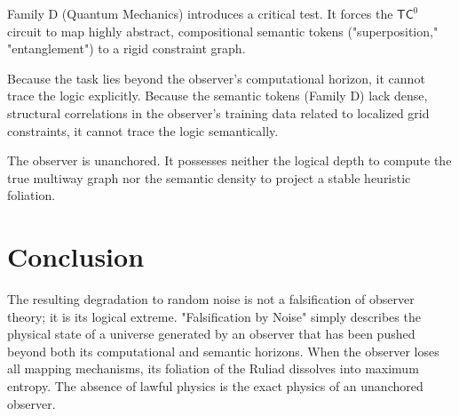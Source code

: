 \documentclass[12pt,a4paper]{article}
\begin{document}
Family D (Quantum Mechanics) introduces a critical test. It forces the $\mathsf{TC}^0$ circuit to map highly abstract, compositional semantic tokens ("superposition," "entanglement") to a rigid constraint graph.

Because the task lies beyond the observer's computational horizon, it cannot trace the logic explicitly. Because the semantic tokens (Family D) lack dense, structural correlations in the observer's training data related to localized grid constraints, it cannot trace the logic semantically.

The observer is unanchored. It possesses neither the logical depth to compute the true multiway graph nor the semantic density to project a stable heuristic foliation.

\section{Conclusion}

The resulting degradation to random noise is not a falsification of observer theory; it is its logical extreme. "Falsification by Noise" simply describes the physical state of a universe generated by an observer that has been pushed beyond both its computational and semantic horizons. When the observer loses all mapping mechanisms, its foliation of the Ruliad dissolves into maximum entropy. The absence of lawful physics is the exact physics of an unanchored observer.
\end{document}
